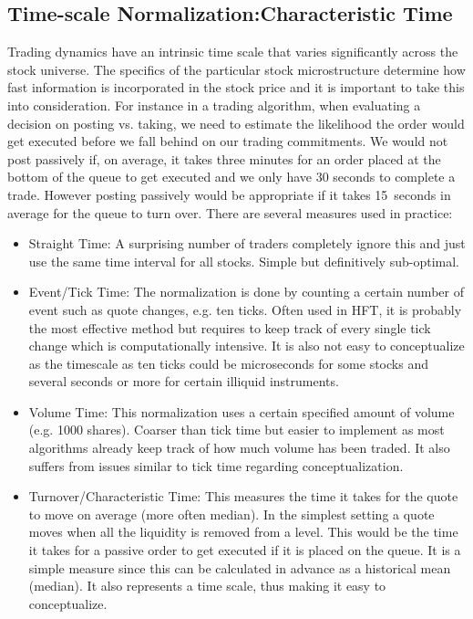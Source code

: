 \subsection{Time-scale Normalization:Characteristic Time}

Trading dynamics have an intrinsic time scale that varies significantly across the stock universe. The specifics of the particular stock microstructure determine how fast information is incorporated in the stock price and it is important to take this into consideration. For instance in a trading algorithm, when evaluating a decision on posting vs. taking, we need to estimate the likelihood the order would get executed before we fall behind on our trading commitments. We would not post passively if, on average, it takes three minutes for an order placed at the bottom of the queue to get executed and we only have 30 seconds to complete a trade. However posting passively would be appropriate if it takes 15~seconds in average for the queue to turn over. There are several measures used in practice:
        \begin{itemize}
        \item Straight Time: A surprising number of traders completely ignore this and just use the same time interval for all stocks. Simple but definitively sub-optimal.
        \item Event/Tick Time: The normalization is done by counting a certain number of event such as quote changes, e.g. ten ticks. Often used in HFT, it is probably the most effective method but requires to keep track of every single tick change which is computationally intensive. It is also not easy to conceptualize as the timescale as ten ticks could be microseconds for some stocks and several seconds or more for certain illiquid instruments.
        \item Volume Time: This normalization uses a certain specified amount of volume (e.g. 1000 shares). Coarser than tick time but easier to implement as most algorithms already keep track of how much volume has been traded. It also suffers from issues similar to tick time regarding conceptualization.
        \item Turnover/Characteristic Time: This measures the time it takes for the quote to move on average (more often median). In the simplest setting a quote moves when all the liquidity is removed from a level. This would be the time it takes for a passive order to get executed if it is placed on the queue. It is a simple measure since this can be calculated in advance as a historical mean (median). It also represents a time scale, thus making it easy to conceptualize.
        \end{itemize}
        
